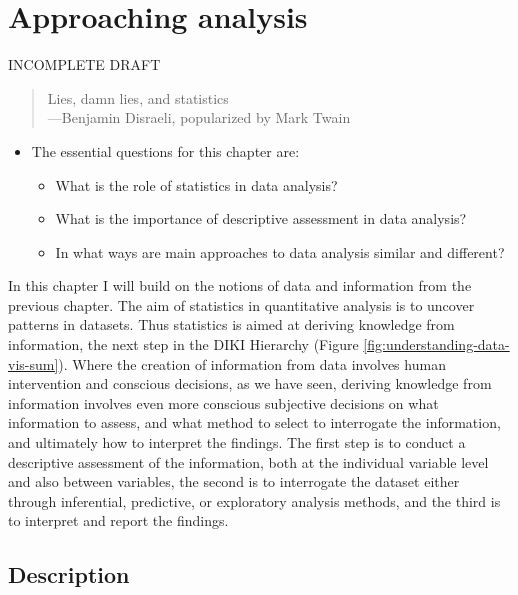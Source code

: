\documentclass[
]{article}
\providecommand{\tightlist}{%
  \setlength{\itemsep}{0pt}\setlength{\parskip}{0pt}}
\newenvironment{rmdblock}[1]
  {\begin{shaded*}
  \begin{itemize}
  \renewcommand{\labelitemi}{
    \raisebox{-.5\height}[0pt][0pt]{
      {\setkeys{Gin}{width=2em,keepaspectratio}\texttt{[image: assets/images/\#1]}}
    }
  }
  \item
  }
  {
  \end{itemize}
  \end{shaded*}
  }
\newenvironment{rmdkey}
  {\begin{rmdblock}{key}}
  {\end{rmdblock}}
\begin{document}
\hypertarget{approaching-analysis}{%
\section{Approaching analysis}\label{approaching-analysis}}

INCOMPLETE DRAFT

\begin{quote}
Lies, damn lies, and statistics\\
---Benjamin Disraeli, popularized by Mark Twain
\end{quote}

\begin{rmdkey}
The essential questions for this chapter are:

\begin{itemize}
\tightlist
\item
  What is the role of statistics in data analysis?
\item
  What is the importance of descriptive assessment in data analysis?
\item
  In what ways are main approaches to data analysis similar and
  different?
\end{itemize}
\end{rmdkey}

In this chapter I will build on the notions of data and information from the previous chapter. The aim of statistics in quantitative analysis is to uncover patterns in datasets. Thus statistics is aimed at deriving knowledge from information, the next step in the DIKI Hierarchy (Figure \ref{fig:understanding-data-vis-sum}). Where the creation of information from data involves human intervention and conscious decisions, as we have seen, deriving knowledge from information involves even more conscious subjective decisions on what information to assess, and what method to select to interrogate the information, and ultimately how to interpret the findings. The first step is to conduct a descriptive assessment of the information, both at the individual variable level and also between variables, the second is to interrogate the dataset either through inferential, predictive, or exploratory analysis methods, and the third is to interpret and report the findings.

\hypertarget{description}{%
\subsection{Description}\label{description}}
\end{document}
